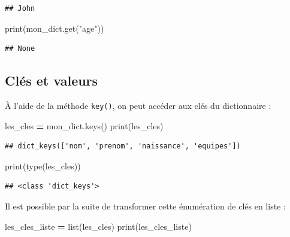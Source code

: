 \documentclass[12pt,]{book}
\newenvironment{Shaded}{\begin{snugshade}}{\end{snugshade}}
\newcommand{\StringTok}[1]{\textcolor[rgb]{0.31,0.60,0.02}{#1}}
\newcommand{\OperatorTok}[1]{\textcolor[rgb]{0.81,0.36,0.00}{\textbf{#1}}}
\newcommand{\BuiltInTok}[1]{#1}
\newcommand{\NormalTok}[1]{#1}
\numberwithin{equation}{section}
\numberwithin{countremarque}{section}
\begin{document}
\begin{lstlisting}
## John
\end{lstlisting}

\begin{Shaded}
\begin{Highlighting}[]
\BuiltInTok{print}\NormalTok{(mon_dict.get(}\StringTok{"age"}\NormalTok{))}
\end{Highlighting}
\end{Shaded}

\begin{lstlisting}
## None
\end{lstlisting}

\subsection{Clés et valeurs}\label{cles-et-valeurs}

À l'aide de la méthode \texttt{key()}, on peut accéder aux clés du
dictionnaire :

\begin{Shaded}
\begin{Highlighting}[]
\NormalTok{les_cles }\OperatorTok{=}\NormalTok{ mon_dict.keys()}
\BuiltInTok{print}\NormalTok{(les_cles)}
\end{Highlighting}
\end{Shaded}

\begin{lstlisting}
## dict_keys(['nom', 'prenom', 'naissance', 'equipes'])
\end{lstlisting}

\begin{Shaded}
\begin{Highlighting}[]
\BuiltInTok{print}\NormalTok{(}\BuiltInTok{type}\NormalTok{(les_cles))}
\end{Highlighting}
\end{Shaded}

\begin{lstlisting}
## <class 'dict_keys'>
\end{lstlisting}

Il est possible par la suite de transformer cette énumération de clés en
liste :

\begin{Shaded}
\begin{Highlighting}[]
\NormalTok{les_cles_liste }\OperatorTok{=} \BuiltInTok{list}\NormalTok{(les_cles)}
\BuiltInTok{print}\NormalTok{(les_cles_liste)}
\end{Highlighting}
\end{Shaded}
\end{document}
